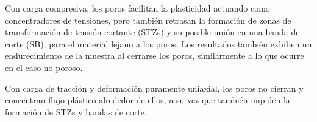 Con carga compresiva, los poros facilitan la plasticidad actuando como concentradores de tensiones, pero también retrasan
la formación de zonas de transformación de tensión cortante (STZs) y su posible unión en una banda de corte (SB), para el material lejano a los poros.
Los resultados también exhiben un endurecimiento de la muestra al cerrarse los poros, similarmente a lo que ocurre en el caso no poroso.

Con carga de tracción y deformación puramente uniaxial, los poros no cierran y concentran flujo plástico alrededor de ellos, a su vez
que también impiden la formación de STZs y bandas de corte.


